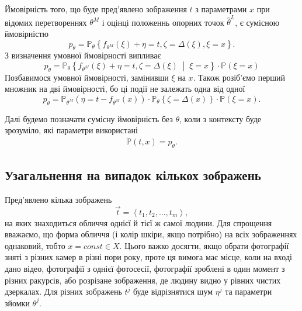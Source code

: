 Ймовірність того,
що буде пред'явлено зображення $t$ з параметрами $x$
при відомих перетвореннях $\theta^M$
і оцінці положеннь опорних точок $\hat{\theta}^L$, є сумісною ймовірністю
\begin{equation*}
  p_{\theta}
  = \mathbb{P}_{\theta}\left\{
    f_{\theta^M}\left( \xi \right) + \eta = t,
    \zeta = \Delta\left( \xi \right),
    \xi = x
  \right\}.
\end{equation*}
З визначення умовної ймовірності випливає
\begin{equation*}
  p_{\theta}
  = \mathbb{P}_{\theta}\left\{
      f_{\theta^M}\left( \xi \right) + \eta = t,
      \zeta = \Delta\left( \xi \right)
      \;\middle|\; \xi = x \right\}
    \cdot \mathbb{P}\left( \xi = x \right)
\end{equation*}
Позбавимося умовної ймовірності, замінивши $\xi$ на $x$.
Також розіб'ємо перший множник на дві ймовірності,
бо ці події не залежать одна від одної
\begin{equation*}
  p_{\theta}
  = \mathbb{P}_{\theta^M}\left( \eta = t - f_{\theta^M}\left( x \right) \right)
    \cdot \mathbb{P}_{\theta}\left\{
      \zeta = \Delta\left( x \right)
    \right\}
    \cdot \mathbb{P}\left( \xi = x \right).
\end{equation*}

Далі будемо позначати сумісну ймовірність без $\theta$,
коли з контексту буде зрозуміло,
які параметри використані
\begin{align*}
  \mathbb{P}\left( t, x \right) = p_{\theta}.
\end{align*}

\subsection{Узагальнення на випадок кількох зображень}

Пред'явлено кілька зображень
\begin{equation*}
  \vec{t} = \left\langle t_1, t_2, \dots, t_m \right\rangle,
\end{equation*}
на яких знаходиться обличчя однієї й тієї ж самої людини.
Для спрощення вважаємо,
що форма обличчя (і колір шкіри, якщо потрібно)
на всіх зображеннях однаковий, тобто $x = const \in X$.
Цього важко досягти,
якщо обрати фотографії зняті з різних камер в різні пори року,
проте ця вимога має місце,
коли на вході дано відео, фотографії з однієї фотосесії,
фотографії зроблені в один момент з різних ракурсів,
або розрізане зображення, де людину видно у рівних чистих дзеркалах.
Для різних зображень $t^j$ буде відрізнятися
шум $\eta^j$ та параметри зйомки $\theta^j$.

